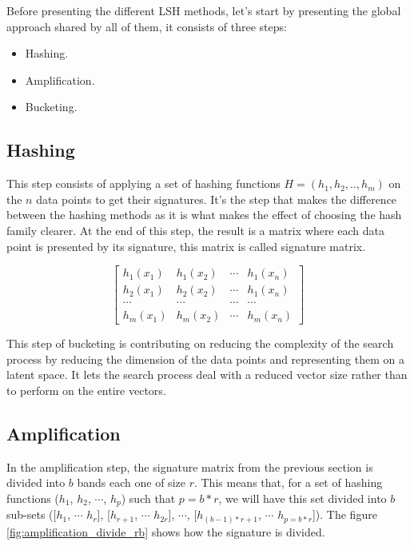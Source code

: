 Before presenting the different LSH methods, let's start by presenting the
global approach shared by all of them, it consists of three steps:
\begin{itemize}
    \item Hashing.
    \item Amplification.
    \item Bucketing.
\end{itemize}

\subsection{Hashing}
This step consists of applying a set of hashing functions $H = (h_1, h_2, ..,
    h_m)$ on the $n$ data points to get their \glspl{signature}. It's the step that
makes the difference between the hashing methods as it is what makes the
effect of choosing the hash family clearer. At the end of this step, the
result is a matrix where each data point is presented by its signature,
this matrix is called signature matrix.

$$\begin{bmatrix} h_1 (x_1) & h_1 (x_2) & \cdots & h_1 (x_n) \\
        h_2 (x_1) & h_2 (x_2) & \cdots & h_1 (x_n) \\
        \cdots    & \cdots    & \cdots & \cdots    \\
        h_m (x_1) & h_m (x_2) & \cdots & h_m (x_n)\end{bmatrix}$$

This step of bucketing is contributing on reducing the complexity of the search
process by reducing the dimension of the data points and representing them on a
latent space. It lets the search process deal with a reduced vector size
rather than to perform on the entire vectors.

\subsection{Amplification}
In the amplification step, the signature matrix from the previous section is divided
into $b$ bands each one of size $r$. This means that, for a set of hashing
functions ($h_1$, $h_2$, $\cdots$, $h_p$) such that $p = b*r$, we will have this
set divided into $b$ sub-sets ([$h_{1}$, $\cdots$ $h_{r}$], [$h_{r+1}$, $\cdots$
        $h_{2r}$], $\cdots$, [$h_{(b-1)*r + 1}$, $\cdots$ $h_{p = b*r}$]). The figure
\ref{fig:amplification_divide_rb} shows how the signature is divided.

